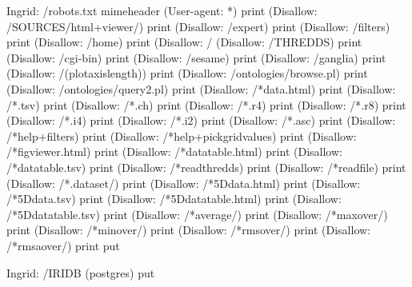 \documentclass{article}
\begin{document}
\begin{ingrid}
Ingrid: /robots.txt {
mimeheader
(User-agent: *\n) print
(Disallow: /SOURCES/html+viewer/\n) print
(Disallow: /expert\n) print
(Disallow: /filters\n) print
(Disallow: /home\n) print
(Disallow: /%
(Disallow: /THREDDS\n) print
(Disallow: /cgi-bin\n) print
(Disallow: /sesame\n) print
(Disallow: /ganglia\n) print
(Disallow: /(plotaxislength)\n) print
(Disallow: /ontologies/browse.pl\n) print
(Disallow: /ontologies/query2.pl\n) print
(Disallow: /*data.html\n) print
(Disallow: /*.tsv\n) print
(Disallow: /*.ch\n) print
(Disallow: /*.r4\n) print
(Disallow: /*.r8\n) print
(Disallow: /*.i4\n) print
(Disallow: /*.i2\n) print
(Disallow: /*.asc\n) print
(Disallow: /*help+filters\n) print
(Disallow: /*help+pickgridvalues\n) print
(Disallow: /*figviewer.html\n) print
(Disallow: /*datatable.html\n) print
(Disallow: /*datatable.tsv\n) print
(Disallow: /*readthredds\n) print
(Disallow: /*readfile\n) print
(Disallow: /*.dataset/\n) print
(Disallow: /*5Ddata.html\n) print
(Disallow: /*5Ddata.tsv\n) print
(Disallow: /*5Ddatatable.html\n) print
(Disallow: /*5Ddatatable.tsv\n) print
(Disallow: /*average/\n) print
(Disallow: /*maxover/\n) print
(Disallow: /*minover/\n) print
(Disallow: /*rmsover/\n) print
(Disallow: /*rmsaover/\n) print
} put
\end{ingrid}

\begin{ingrid}
Ingrid: /IRIDB (postgres) put
\end{ingrid}
\end{document}
